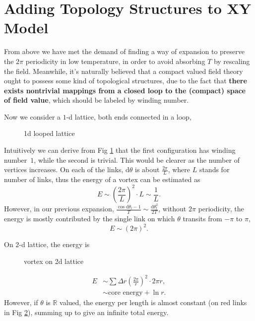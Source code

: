 
\section{Adding Topology Structures to XY Model}

From above we have met the demand of finding a way of expansion to preserve the $2\pi $ periodicity in low temperature, in order to avoid absorbing $T$ by rescaling the field. Meanwhile, it's naturally believed that a compact valued field theory ought to possess some kind of topological structures, due to the fact that \textbf{there exists nontrivial mappings from a closed loop to the (compact) space of field value}, which should be labeled by winding number.

Now we consider a $1$-d lattice, both ends connected in a loop,

\begin{figure}[ht]
    \centering
    \caption{1d looped lattice}
    \label{fig:1d-looped-lattice}
\end{figure}
Intuitively we can derive from Fig \ref{fig:1d-looped-lattice} that the first configuration has winding number~$1$, while the second is trivial. This would be clearer as the number of vertices increases. 
On each of the links, $\mathrm{d} \theta$ is about $\frac{2\pi }{L}$, where $L$ stands for number of links, thus the energy of a vortex can be estimated as
\begin{equation}
  E \sim \left( \frac{2\pi }{L} \right)^{2} \cdot L \sim \frac{1}{L}.
\end{equation}
However, in our previous expansion, $\frac{\cos \mathrm{d} \theta_{l}-1}{T} \sim \frac{\mathrm{d} \theta_{l}^{2}}{2T}$, without $2\pi $ periodicity, the energy is mostly contributed by the single link on which $\theta$ transits from $-\pi $ to $\pi $,
\begin{equation}
  E \sim \left( 2\pi  \right)^{2}.
\end{equation}

On $2$-d lattice, the energy is
\begin{figure}[ht]
    \centering
    \caption{vortex on 2d lattice}
    \label{fig:vortex-on-2d-lattice}
\end{figure}
\begin{equation}
  \begin{aligned}
    E  & \sim \sum \Delta r \left( \frac{2\pi }{r} \right)^{2} \cdot 2\pi  r ,\\
       & \sim \text{core energy} + \ln r.
  \end{aligned}
\end{equation}
However, if $\theta$ is $\mathbb{R}$ valued, the energy per length is almost constant (on red links in Fig \ref{fig:vortex-on-2d-lattice}), summing up to give an infinite total energy.


